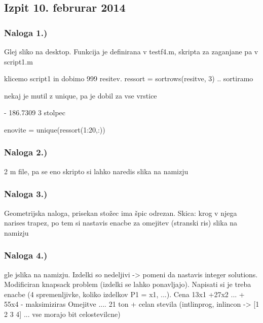 \documentclass[a4paper,11pt]{article}
\begin{document}
\subsection{Izpit 10. februrar 2014}

\subsubsection{Naloga 1.)}

Glej sliko na desktop.
Funkcija je definirana v testf4.m, skripta za zaganjane pa v script1.m

klicemo script1 in dobimo 999 resitev.
ressort = sortrows(resitve, 3) .. sortiramo

nekaj je mutil z unique, pa je dobil za vse vrstice 

- 186.7309 3 stolpec

enovite = unique(ressort(1:20,:))

\subsubsection{Naloga 2.)}

2 m file, pa se eno skripto si lahko naredis slika na namizju

\subsubsection{Naloga 3.)}

Geometrijska naloga, prisekan stožec ima špic odrezan. Skica: krog v njega narises trapez, po tem si nastavis enacbe za omejitev (stranski ris) slika na namizju


\subsubsection{Naloga 4.)}

gle jslika na namizju. Izdelki so nedeljivi -> pomeni da nastavis integer solutions. Modificiran knapsack problem (izdelki se lahko ponavljajo). Napisati si je treba enacbe (4 spremenljivke, koliko izdelkov P1 = x1, ...).
Cena 13x1  +27x2 ... + 55x4 - maksimiziras
Omejitve .... 21 ton + celan stevila (intlinprog, inlincon -> [1 2 3 4] ... vse morajo bit celostevilcne) 
\end{document}
